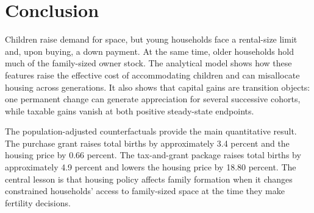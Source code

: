\documentclass[11pt]{article}
\theoremstyle{definition}
\newcommand{\1}{\mathbf 1}
\begin{document}
\section{Conclusion}

Children raise demand for space, but young households face a rental-size limit
and, upon buying, a down payment. At the same time, older households hold much
of the family-sized owner stock. The analytical model shows how these features
raise the effective cost of accommodating children and can misallocate housing
across generations. It also shows that capital gains are transition objects:
one permanent change can generate appreciation for several successive cohorts,
while taxable gains vanish at both positive steady-state endpoints.

The population-adjusted counterfactuals provide the main quantitative result.
The purchase grant raises total births by approximately 3.4 percent and
the housing price by 0.66 percent. The tax-and-grant package raises total
births by approximately 4.9 percent and lowers the housing price by 18.80
percent. The central lesson is that housing policy affects family formation
when it changes constrained households' access to family-sized space at the
time they make fertility decisions.

\clearpage
\appendix


\clearpage


\end{document}
